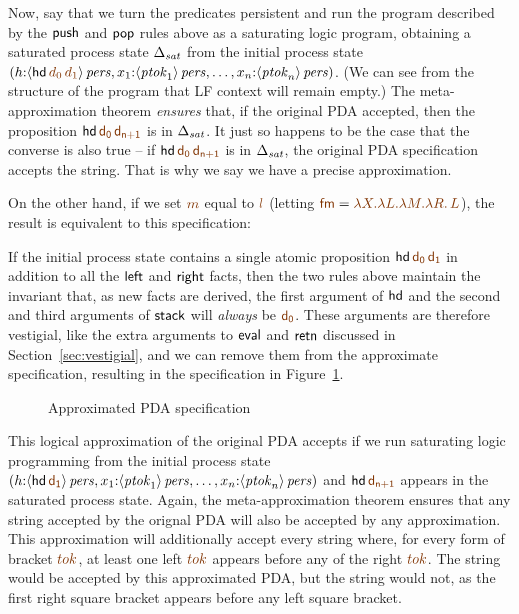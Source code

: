 Now, say that we turn the predicates persistent and  run the program
described by the ${\sf push}$ and ${\sf pop}$ rules above as a
saturating logic program, obtaining a saturated process state
$\Delta_{\it sat}$ from the initial process state $(h{:}\ispers{\susp{{\sf
      hd}\,\lf{d_0}\,\lf{d_1}}}, x_1{:}\ispers{\susp{{\it ptok}_1}}, \ldots,
x_n{:}\ispers{\susp{{\it ptok}_n}})$. (We can see from the
structure of the program that LF context will remain empty.)  The
meta-approximation theorem {\it ensures} that, if the original PDA
accepted, then the proposition ${\sf hd}\,\lf{\sf d_0}\,\lf{\sf d_{n+1}}$ is
in $\Delta_{\it sat}$. It just so happens to be the case that the
converse is also true -- if ${\sf hd}\,\lf{\sf d_0}\,\lf{\sf d_{n+1}}$ is in
$\Delta_{\it sat}$, the original PDA specification accepts the string. 
That is why we say we have
a precise approximation.

On the other hand, if we set $\lf{m}$ equal to $\lf{l}$ 
(letting $\lf{\sf fm} = \lf{\lambda X. \lambda L. \lambda M. \lambda R.\, L}$), 
the result is equivalent to this specification:

\smallskip
{}
\smallskip

\noindent
If the initial process state contains a single atomic proposition
${\sf hd}\,\lf{\sf d_0}\,\lf{\sf d_1}$ in addition to all the ${\sf
  left}$ and ${\sf right}$ facts, then the two rules above maintain
the invariant that, as new facts are derived, the first argument of
${\sf hd}$ and the second and third arguments of ${\sf stack}$ will
{\it always} be $\lf{\sf d_0}$.  These arguments are therefore vestigial,
like the extra arguments to ${\sf eval}$ and ${\sf retn}$ discussed in
Section~\ref{sec:vestigial}, and we can remove them from the
approximate specification, resulting in the specification in
Figure~\ref{fig:pda-pers-approx2}.

\begin{figure}[ht]
\caption{Approximated PDA specification}
\label{fig:pda-pers-approx2}
\end{figure}

This logical approximation of the original PDA accepts if we run
saturating logic programming from the initial process state
$(h{:}\ispers{\susp{{\sf hd}\,\lf{\sf d_1}}}, x_1{:}\ispers{\susp{{\it
      ptok}_1}}, \ldots, x_n{:}\ispers{\susp{{\it ptok}_n}})$ and
${\sf hd}\,\lf{\sf d_{n+1}}$ appears in the saturated process
state. Again, the meta-approximation theorem ensures that any string
accepted by the orignal PDA will also be accepted by any
approximation. This approximation will additionally accept every
string where, for every form of bracket $\lf{tok}$, at least one left
$\lf{tok}$ appears before any of the right $\lf{tok}$. The string
\obj{\mbox{\sf [ ] ] ] ( ( )}} would be accepted by this approximated
PDA, but the string \obj{\mbox{\sf ( ) ] [ [ ]}} would not, as the
first right square bracket appears before any left square
bracket. 


